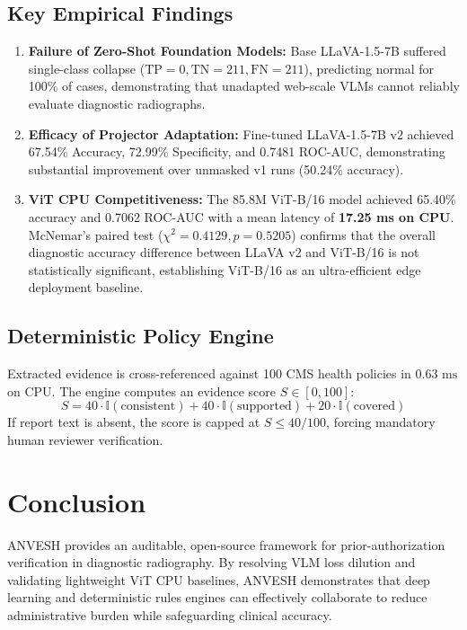 \documentclass[conference]{IEEEtran}
\begin{document}
\subsection{Key Empirical Findings}
\begin{enumerate}
    \item \textbf{Failure of Zero-Shot Foundation Models:} Base LLaVA-1.5-7B suffered single-class collapse ($\text{TP}=0, \text{TN}=211, \text{FN}=211$), predicting normal for 100\% of cases, demonstrating that unadapted web-scale VLMs cannot reliably evaluate diagnostic radiographs.
    \item \textbf{Efficacy of Projector Adaptation:} Fine-tuned LLaVA-1.5-7B v2 achieved 67.54\% Accuracy, 72.99\% Specificity, and 0.7481 ROC-AUC, demonstrating substantial improvement over unmasked v1 runs (50.24\% accuracy).
    \item \textbf{ViT CPU Competitiveness:} The 85.8M ViT-B/16 model achieved 65.40\% accuracy and 0.7062 ROC-AUC with a mean latency of \textbf{17.25 ms on CPU}. McNemar's paired test ($\chi^2 = 0.4129, p = 0.5205$) confirms that the overall diagnostic accuracy difference between LLaVA v2 and ViT-B/16 is not statistically significant, establishing ViT-B/16 as an ultra-efficient edge deployment baseline.
\end{enumerate}

\subsection{Deterministic Policy Engine}
Extracted evidence is cross-referenced against 100 CMS health policies in $0.63\text{ ms}$ on CPU. The engine computes an evidence score $S \in [0, 100]$:
\begin{equation}
S = 40 \cdot \mathbb{I}(\text{consistent}) + 40 \cdot \mathbb{I}(\text{supported}) + 20 \cdot \mathbb{I}(\text{covered})
\end{equation}
If report text is absent, the score is capped at $S \le 40/100$, forcing mandatory human reviewer verification.

\section{Conclusion}
ANVESH provides an auditable, open-source framework for prior-authorization verification in diagnostic radiography. By resolving VLM loss dilution and validating lightweight ViT CPU baselines, ANVESH demonstrates that deep learning and deterministic rules engines can effectively collaborate to reduce administrative burden while safeguarding clinical accuracy.



\end{document}
